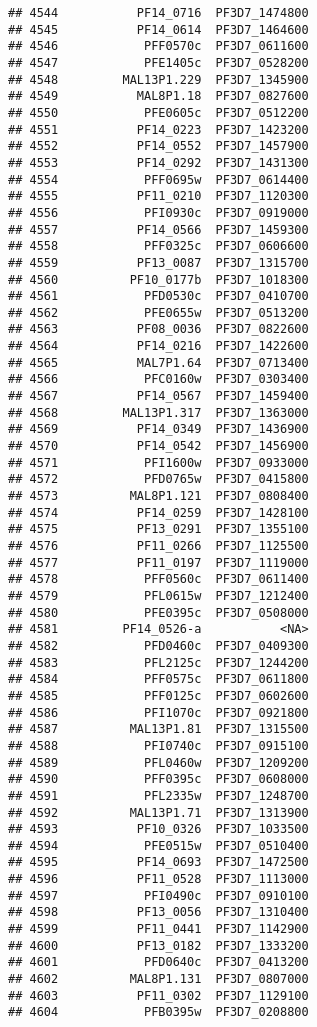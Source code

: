 \documentclass[12pt, a4paper]{article}\usepackage[]{graphicx}\usepackage[]{color}
\makeatletter
\newenvironment{kframe}{%
 \def\at@end@of@kframe{}%
 \ifinner\ifhmode%
  \def\at@end@of@kframe{\end{minipage}}%
  \begin{minipage}{\columnwidth}%
 \fi\fi%
 \def\FrameCommand##1{\hskip\@totalleftmargin \hskip-\fboxsep
 \colorbox{shadecolor}{##1}\hskip-\fboxsep
     \hskip-\linewidth \hskip-\@totalleftmargin \hskip\columnwidth}%
 \MakeFramed {\advance\hsize-\width
   \@totalleftmargin\z@ \linewidth\hsize
   \@setminipage}}%
 {\par\unskip\endMakeFramed%
 \at@end@of@kframe}
\newenvironment{knitrout}{}{} %
\makeatother
\begin{document}
\begin{knitrout}
\begin{kframe}
\begin{verbatim}
## 4544           PF14_0716  PF3D7_1474800
## 4545           PF14_0614  PF3D7_1464600
## 4546            PFF0570c  PF3D7_0611600
## 4547            PFE1405c  PF3D7_0528200
## 4548         MAL13P1.229  PF3D7_1345900
## 4549           MAL8P1.18  PF3D7_0827600
## 4550            PFE0605c  PF3D7_0512200
## 4551           PF14_0223  PF3D7_1423200
## 4552           PF14_0552  PF3D7_1457900
## 4553           PF14_0292  PF3D7_1431300
## 4554            PFF0695w  PF3D7_0614400
## 4555           PF11_0210  PF3D7_1120300
## 4556            PFI0930c  PF3D7_0919000
## 4557           PF14_0566  PF3D7_1459300
## 4558            PFF0325c  PF3D7_0606600
## 4559           PF13_0087  PF3D7_1315700
## 4560          PF10_0177b  PF3D7_1018300
## 4561            PFD0530c  PF3D7_0410700
## 4562            PFE0655w  PF3D7_0513200
## 4563           PF08_0036  PF3D7_0822600
## 4564           PF14_0216  PF3D7_1422600
## 4565           MAL7P1.64  PF3D7_0713400
## 4566            PFC0160w  PF3D7_0303400
## 4567           PF14_0567  PF3D7_1459400
## 4568         MAL13P1.317  PF3D7_1363000
## 4569           PF14_0349  PF3D7_1436900
## 4570           PF14_0542  PF3D7_1456900
## 4571            PFI1600w  PF3D7_0933000
## 4572            PFD0765w  PF3D7_0415800
## 4573          MAL8P1.121  PF3D7_0808400
## 4574           PF14_0259  PF3D7_1428100
## 4575           PF13_0291  PF3D7_1355100
## 4576           PF11_0266  PF3D7_1125500
## 4577           PF11_0197  PF3D7_1119000
## 4578            PFF0560c  PF3D7_0611400
## 4579            PFL0615w  PF3D7_1212400
## 4580            PFE0395c  PF3D7_0508000
## 4581         PF14_0526-a           <NA>
## 4582            PFD0460c  PF3D7_0409300
## 4583            PFL2125c  PF3D7_1244200
## 4584            PFF0575c  PF3D7_0611800
## 4585            PFF0125c  PF3D7_0602600
## 4586            PFI1070c  PF3D7_0921800
## 4587          MAL13P1.81  PF3D7_1315500
## 4588            PFI0740c  PF3D7_0915100
## 4589            PFL0460w  PF3D7_1209200
## 4590            PFF0395c  PF3D7_0608000
## 4591            PFL2335w  PF3D7_1248700
## 4592          MAL13P1.71  PF3D7_1313900
## 4593           PF10_0326  PF3D7_1033500
## 4594            PFE0515w  PF3D7_0510400
## 4595           PF14_0693  PF3D7_1472500
## 4596           PF11_0528  PF3D7_1113000
## 4597            PFI0490c  PF3D7_0910100
## 4598           PF13_0056  PF3D7_1310400
## 4599           PF11_0441  PF3D7_1142900
## 4600           PF13_0182  PF3D7_1333200
## 4601            PFD0640c  PF3D7_0413200
## 4602          MAL8P1.131  PF3D7_0807000
## 4603           PF11_0302  PF3D7_1129100
## 4604            PFB0395w  PF3D7_0208800

\end{verbatim}
\end{kframe}
\end{knitrout}
\end{document}
